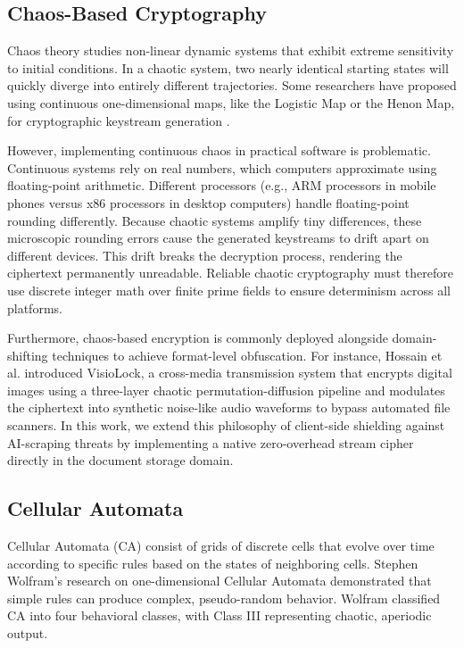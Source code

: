 \documentclass[runningheads]{llncs}
\begin{document}
\subsection{Chaos-Based Cryptography}
Chaos theory studies non-linear dynamic systems that exhibit extreme sensitivity to initial conditions. In a chaotic system, two nearly identical starting states will quickly diverge into entirely different trajectories. Some researchers have proposed using continuous one-dimensional maps, like the Logistic Map or the Henon Map, for cryptographic keystream generation \cite{baptista1998,kocarev2001}.

However, implementing continuous chaos in practical software is problematic. Continuous systems rely on real numbers, which computers approximate using floating-point arithmetic. Different processors (e.g., ARM processors in mobile phones versus x86 processors in desktop computers) handle floating-point rounding differently. Because chaotic systems amplify tiny differences, these microscopic rounding errors cause the generated keystreams to drift apart on different devices. This drift breaks the decryption process, rendering the ciphertext permanently unreadable. Reliable chaotic cryptography must therefore use discrete integer math over finite prime fields to ensure determinism across all platforms.

Furthermore, chaos-based encryption is commonly deployed alongside domain-shifting techniques to achieve format-level obfuscation. For instance, Hossain et al. \cite{hossain2026visiolock} introduced VisioLock, a cross-media transmission system that encrypts digital images using a three-layer chaotic permutation-diffusion pipeline and modulates the ciphertext into synthetic noise-like audio waveforms to bypass automated file scanners. In this work, we extend this philosophy of client-side shielding against AI-scraping threats by implementing a native zero-overhead stream cipher directly in the document storage domain.

\subsection{Cellular Automata}
Cellular Automata (CA) consist of grids of discrete cells that evolve over time according to specific rules based on the states of neighboring cells. Stephen Wolfram's research on one-dimensional Cellular Automata \cite{wolfram1983} demonstrated that simple rules can produce complex, pseudo-random behavior. Wolfram classified CA into four behavioral classes, with Class III representing chaotic, aperiodic output.
\end{document}
